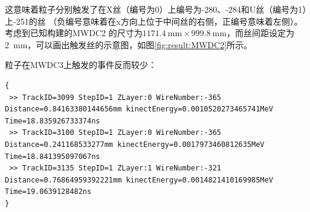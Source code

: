 \documentclass[bachelor,openany,oneside,color]{buaathesis}
\begin{document}
这意味着粒子分别触发了在X丝（编号为0）上编号为-280、-284和U丝（编号为1）上-251的丝
（负编号意味着在x方向上位于中间丝的右侧，正编号意味着左侧）。考虑到已知构建的MWDC2
的尺寸为$\SI{1171.4}{\milli\meter}\times\SI{999.8}{\milli\meter}$，而丝间距设定为
\SI{2}{\milli\meter}，可以画出触发丝的示意图，如图\ref{fig:result:MWDC2}所示。


%
%
粒子在MWDC3上触发的事件反而较少：

\begin{lstlisting}[firstnumber=4213,lastline=4215]
{
 >> TrackID=3099 StepID=1 ZLayer:0 WireNumber:-365 Distance=0.84163380144656mm kinectEnergy=0.0010520273465741MeV Time=18.835926733374ns
 >> TrackID=3100 StepID=1 ZLayer:0 WireNumber:-365 Distance=0.241168533277mm kinectEnergy=0.0017973460812635MeV Time=18.841395097067ns
 >> TrackID=3135 StepID=1 ZLayer:1 WireNumber:-321 Distance=0.76864959392221mm kinectEnergy=0.0014821410169985MeV Time=19.0639128482ns
}
\end{lstlisting}
\end{document}
